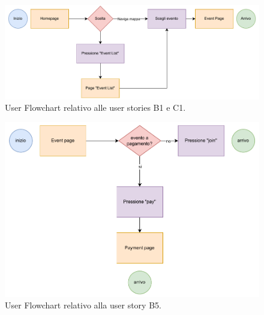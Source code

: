 \documentclass[9pt]{extarticle}
\begin{document}
\begin{figure}[!htb]
	\centering
	\includegraphics[width=\linewidth]{./images/EventSelection.pdf}
	\caption{User Flowchart relativo alle user stories B1 e C1.}
	\label{fig:B1-C1}
\end{figure}

\newpage

\begin{figure}[!htb]
	\centering
	\includegraphics[width=0.8\linewidth]{./images/B5.pdf}
	\caption{User Flowchart relativo alla user story B5.}
	\label{fig:B5}
\end{figure}

	
\end{document}
